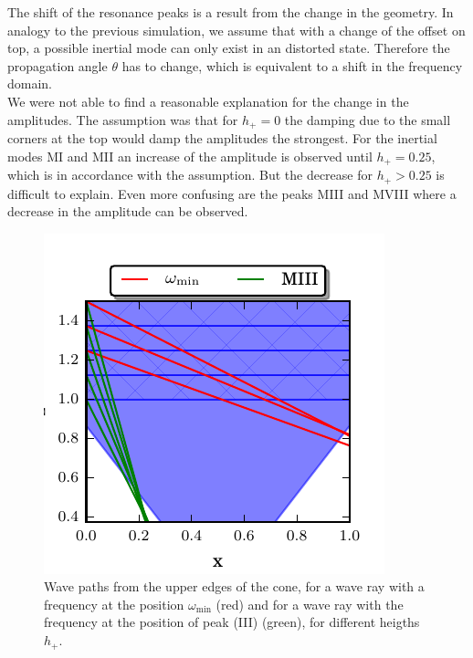 The shift of the resonance peaks is a result from the change in the geometry.
In analogy to the previous simulation, we assume that with a change of the offset on top,
a possible inertial mode can only exist in an distorted state.
Therefore the propagation angle $\theta$ has to change,
which is equivalent to a shift in the frequency domain.\\
We were not able to find a reasonable explanation for the change in the amplitudes.
The assumption was that for $h_+=0$ the damping due to the small corners at the top
would damp the amplitudes the strongest.
For the inertial modes M\RN{1} and M\RN{2} an increase of the amplitude is observed until $h_+=0.25$,
which is in accordance with the assumption.
But the decrease for $h_+>0.25$ is difficult to explain.
Even more confusing are  the peaks M\RN{3} and M\RN{8} where a decrease in the amplitude
can be observed.

\begin{figure}[!t]
  \begin{minipage}[c]{0.4\textwidth}
      \centering
      \includegraphics{gfx/cone/discussion/corners.pdf}
  \end{minipage}
  \hfill
  \begin{minipage}[c]{0.5\textwidth}
      \caption{\label{fig:conediscuss:corners}
        Wave paths from the upper edges of the cone,
        for a wave ray with a frequency at the position $\omega_{\text{min}}$ (red) and
        for a wave ray with the frequency at the position of peak (\RN{3}) (green),
            for different heigths $h_+$.
      }
  \end{minipage}
\end{figure}


